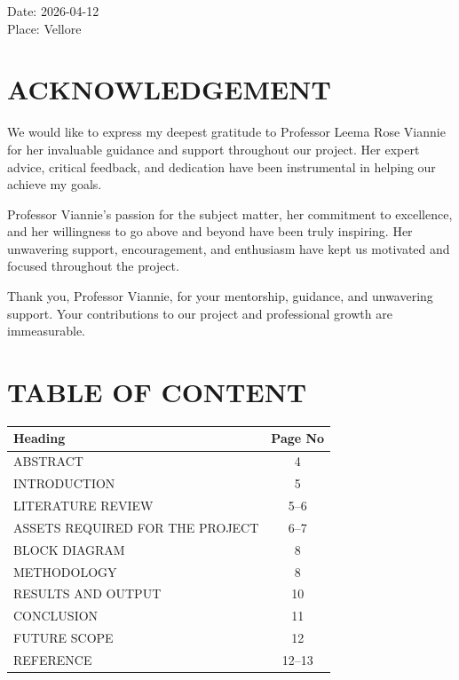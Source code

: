 \documentclass[a4paper,12pt]{report}
\begin{document}
\begin{flushleft}
Date: 2026-04-12 \\
Place: Vellore

\newpage
\section*{ACKNOWLEDGEMENT}

We would like to express my deepest gratitude to Professor Leema Rose Viannie for her
invaluable guidance and support throughout our project. Her expert advice, critical feedback,
and dedication have been instrumental in helping our achieve my goals. \\ 

\vspace{0.2cm}

Professor Viannie's passion for the subject matter, her commitment to excellence, and her
willingness to go above and beyond have been truly inspiring. Her unwavering support,
encouragement, and enthusiasm have kept us motivated and focused throughout the project.

\vspace{0.2cm}

Thank you, Professor Viannie, for your mentorship, guidance, and unwavering support. Your
contributions to our project and  professional growth are immeasurable.
\end{flushleft}

\newpage

\section*{TABLE OF CONTENT}


\begin{center}
\renewcommand{\arraystretch}{1.3} %

\begin{tabular}{|p{10cm}|c|}
\hline
\textbf{Heading} & \textbf{Page No} \\
\hline

ABSTRACT & 4 \\
\hline

INTRODUCTION & 5 \\
\hline
LITERATURE REVIEW & 5--6 \\
\hline
ASSETS REQUIRED FOR THE PROJECT & 6--7 \\
\hline
BLOCK DIAGRAM & 8 \\
\hline
METHODOLOGY & 8 \\
\hline
RESULTS AND OUTPUT & 10 \\
\hline
CONCLUSION & 11 \\
\hline
FUTURE SCOPE & 12 \\
\hline
REFERENCE & 12--13 \\
\hline

\end{tabular}
\end{center}
\end{document}
